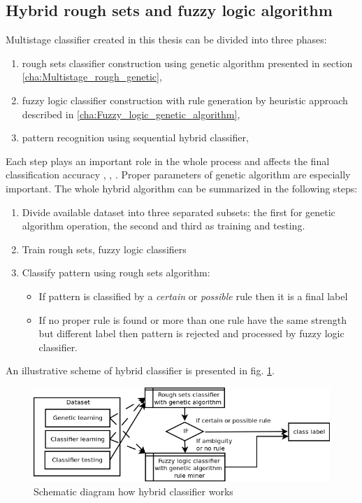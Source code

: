 \subsection{Hybrid rough sets and fuzzy logic algorithm}
\label{cha:Multistage_rough_fuzzy}
Multistage classifier created in this thesis can be divided into three phases:
\begin{enumerate}
    \item rough sets classifier construction using genetic algorithm presented
        in section \ref{cha:Multistage_rough_genetic},
    \item fuzzy logic classifier construction with rule generation by heuristic
        approach described in \ref{cha:Fuzzy_logic_genetic_algorithm},
    \item pattern recognition using sequential hybrid classifier,
\end{enumerate}
Each step plays an important role in the whole process and affects the final
classification accuracy \cite{bib12}, \cite{bib27}, \cite{bib32}. Proper parameters of genetic algorithm are especially
important. The whole hybrid algorithm can be summarized in the following steps:
\begin{enumerate}
    \item Divide available dataset into three separated subsets: the first for
        genetic algorithm operation, the second and third as training and
        testing.
    \item Train rough sets, fuzzy logic classifiers
    \item Classify pattern using rough sets algorithm:
        \begin{itemize}
            \item If pattern is classified by a \textit{certain} or
                \textit{possible} rule then it is a final label
            \item If no proper rule is found or more than one rule have the same
                strength but different label then pattern is rejected and
                processed by fuzzy logic classifier.
        \end{itemize}
\end{enumerate}
An illustrative scheme of hybrid classifier is presented in fig. \ref{fig:schematic}.
\begin{figure}[H]
    \begin{center}
        \includegraphics[width=\textwidth]{fig/diagram.png}
    \end{center}
    \caption{Schematic diagram how hybrid classifier works}
    \label{fig:schematic}
\end{figure}
